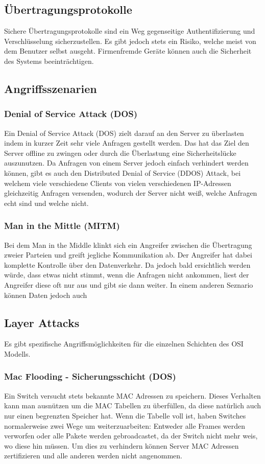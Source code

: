 \documentclass{article}
\begin{document}
	  \subsection{Übertragungsprotokolle}
	  Sichere Übertragungsprotokolle sind ein Weg gegenseitige Authentifizierung und Verschlüsselung sicherzustellen. Es gibt jedoch stets ein Risiko, welche meist von dem Benutzer selbst ausgeht. Firmenfremde Geräte können auch die Sicherheit des Systems beeinträchtigen.
	  \subsection{Angriffsszenarien}
	  \subsubsection{Denial of Service Attack (DOS)}
	  Ein Denial of Service Attack (DOS) zielt darauf an den Server zu überlasten indem in kurzer Zeit sehr viele Anfragen gestellt werden. Das hat das Ziel den Server offline zu zwingen oder durch die Überlastung eine Sicherheitslücke auszunutzen. Da Anfragen von einem Server jedoch einfach verhindert werden können, gibt es auch den Distributed Denial of Service (DDOS) Attack, bei welchem viele verschiedene Clients von vielen verschiedenen IP-Adressen gleichzeitig Anfragen versenden, wodurch der Server nicht weiß, welche Anfragen echt sind und welche nicht.
	  \subsubsection{Man in the Mittle (MITM)}
	  Bei dem Man in the Middle klinkt sich ein Angreifer zwischen die Übertragung zweier Parteien und greift jegliche Kommunikation ab. Der Angreifer hat dabei komplette Kontrolle über den Datenverkehr. Da jedoch bald ersichtlich werden würde, dass etwas nicht stimmt, wenn die Anfragen nicht ankommen, liest der Angreifer diese oft nur aus und gibt sie dann weiter. In einem anderen Seznario können Daten jedoch auch 
	  \subsection{Layer Attacks}
	  Es gibt spezifische Angriffsmöglichkeiten für die einzelnen Schichten des OSI Modells.
	  \subsubsection{Mac Flooding - Sicherungsschicht (DOS)}
	  Ein Switch versucht stets bekannte MAC Adressen zu speichern. Dieses Verhalten kann man ausnützen um die MAC Tabellen zu überfüllen, da diese natürlich auch nur einen begrenzten Speicher hat. Wenn die Tabelle voll ist, haben Switches normalerweise zwei Wege um weiterzuarbeiten: Entweder alle Frames werden verworfen oder alle Pakete werden gebroadcastet, da der Switch nicht mehr weis, wo diese hin müssen. Um dies zu verhindern können Server MAC Adressen zertifizieren und alle anderen werden nicht angenommen.
\end{document}
